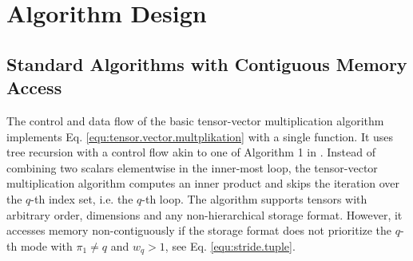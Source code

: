 \section{Algorithm Design}
\label{sec:design}
\subsection{Standard Algorithms with Contiguous Memory Access}
The control and data flow of the basic tensor-vector multiplication algorithm implements Eq. \eqref{equ:tensor.vector.multplikation} with a single function.
It uses tree recursion with a control flow akin to one of Algorithm 1 in \cite{bassoy:2018:fast}.
Instead of combining two scalars elementwise in the inner-most loop, the tensor-vector multiplication algorithm computes an inner product and skips the iteration over the $q$-th index set, i.e. the $q$-th loop.
The algorithm supports tensors with arbitrary order, dimensions and any non-hierarchical storage format.
However, it accesses memory non-contiguously if the storage format does not prioritize the $q$-th mode with $\pi_1 \neq q$ and $w_q>1$, see Eq. \eqref{equ:stride.tuple}. %
